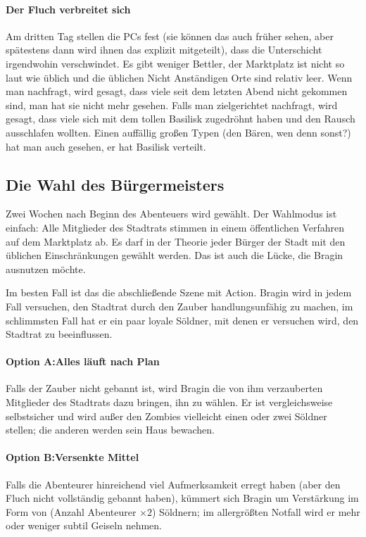 \documentclass[a4paper,10pt]{scrartcl}
\def\drugname{Basilisk}
\begin{document}
\paragraph{Der Fluch verbreitet sich}

Am dritten Tag stellen die PCs fest (sie können das auch früher sehen,
aber spätestens dann wird ihnen das explizit mitgeteilt), dass die
Unterschicht irgendwohin verschwindet. Es gibt weniger Bettler, der
Marktplatz ist nicht so laut wie üblich und die üblichen Nicht
Anständigen Orte sind relativ leer. Wenn man nachfragt, wird gesagt,
dass viele seit dem letzten Abend nicht gekommen sind, man hat sie nicht
mehr gesehen. Falls man zielgerichtet nachfragt, wird gesagt, dass viele
sich mit dem tollen \drugname{} zugedröhnt haben und den Rausch
ausschlafen wollten. Einen auffällig großen Typen (den Bären, wen denn
sonst?) hat man auch gesehen, er hat \drugname{} verteilt.

\subsection{Die Wahl des Bürgermeisters}

Zwei Wochen nach Beginn des Abenteuers wird gewählt. Der Wahlmodus ist einfach: 
Alle Mitglieder des Stadtrats stimmen in einem öffentlichen Verfahren auf dem 
Marktplatz ab. Es darf in der Theorie jeder Bürger der Stadt mit den üblichen 
Einschränkungen gewählt werden. Das ist auch die Lücke, die Bragin ausnutzen 
möchte.

Im besten Fall ist das die abschließende Szene mit Action. Bragin wird
in jedem Fall versuchen, den Stadtrat durch den Zauber handlungsunfähig
zu machen, im schlimmsten Fall hat er ein paar loyale Söldner, mit denen
er versuchen wird, den Stadtrat zu beeinflussen.

\paragraph{Option A:\@ Alles läuft nach Plan}
Falls der Zauber nicht gebannt ist, wird Bragin die von ihm verzauberten
Mitglieder des Stadtrats dazu bringen, ihn zu wählen. Er ist
vergleichsweise selbstsicher und wird außer den Zombies vielleicht einen
oder zwei Söldner stellen; die anderen werden sein Haus bewachen.

\paragraph{Option B:\@ Versenkte Mittel}
Falls die Abenteurer hinreichend viel Aufmerksamkeit erregt haben (aber
den Fluch nicht vollständig gebannt haben), kümmert sich Bragin um
Verstärkung im Form von (Anzahl Abenteurer $\times 2$) Söldnern; im
allergrößten Notfall wird er mehr oder weniger subtil Geiseln nehmen.
\end{document}
